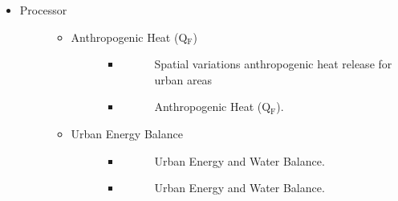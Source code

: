 \documentclass[letterpaper,10pt,english]{sphinxmanual}
\begin{document}
\begin{itemize}
\item {} \begin{description}
\item[{Processor}] \leavevmode\begin{itemize}
\item {} \begin{description}
\item[{Anthropogenic Heat (Q$_{\text{F}}$)}] \leavevmode\begin{itemize}
\item {} \begin{description}
\item[{}] \leavevmode
Spatial variations anthropogenic heat release for urban areas

\end{description}

\item {} \begin{description}
\item[{}] \leavevmode
Anthropogenic Heat (Q$_{\text{F}}$).

\end{description}

\end{itemize}

\end{description}

\item {} \begin{description}
\item[{Urban Energy Balance}] \leavevmode\begin{itemize}
\item {} \begin{description}
\item[{}] \leavevmode
Urban Energy and Water Balance.

\end{description}

\item {} \begin{description}
\item[{}] \leavevmode
Urban Energy and Water Balance.


\end{description}
\end{itemize}
\end{description}
\end{itemize}
\end{description}
\end{itemize}
\end{document}

